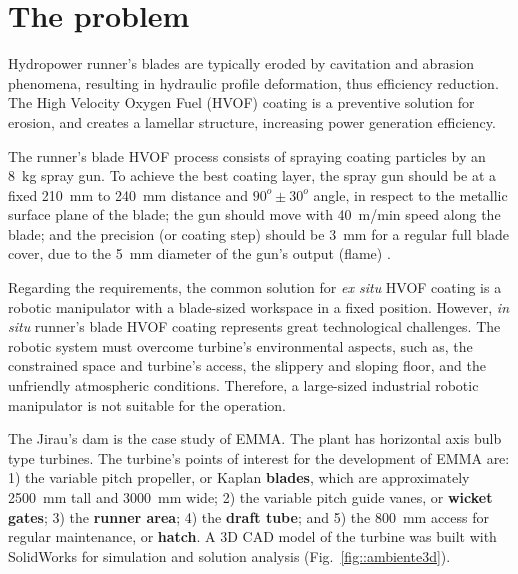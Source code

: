 \section{The problem}\label{problem}

Hydropower runner's blades are typically eroded by cavitation and abrasion
phenomena, resulting in hydraulic profile deformation, thus efficiency
reduction. The High Velocity Oxygen Fuel (HVOF) coating is a preventive
solution for erosion, and creates a lamellar structure, increasing
power generation efficiency. 

The runner's blade HVOF process consists of spraying coating particles
by an 8~kg spray gun. To achieve the best coating layer, the spray gun should be at a
fixed 210~mm to 240~mm distance and $90^o \pm 30^o$ angle, in respect
to the metallic surface plane of the blade; the gun should move with 40~m/min
speed along the blade; and the precision (or coating step) should be 3~mm for a
regular full blade cover, due to the 5~mm diameter of the gun's output (flame)
\cite{li2002effect}.

Regarding the requirements, the common solution for \textit{ex situ} HVOF
coating is a robotic manipulator with a blade-sized workspace in a fixed
position. However, \textit{in situ} runner's blade HVOF coating represents
great technological challenges. %
The robotic system must overcome
turbine's environmental aspects, such as, the constrained space and turbine's
access, the slippery and sloping floor, and the unfriendly atmospheric
conditions. Therefore, a large-sized industrial robotic manipulator is not
suitable for the operation.

The Jirau's dam is the case study of EMMA. The plant has horizontal
axis bulb type turbines. 
The turbine's points of interest for the
development of EMMA are: 1) the variable pitch propeller, or Kaplan
\textbf{blades}, which are approximately 2500~mm tall and 3000~mm wide; 2) the
variable pitch guide vanes, or \textbf{wicket gates}; 3) the \textbf{runner
area}; 4) the \textbf{draft tube}; and 5) the 800~mm access for regular
maintenance, or \textbf{hatch}. A 3D CAD model of the turbine was built with
SolidWorks\raisebox{1ex}{\textregistered} for simulation and solution analysis
(Fig.~\ref{fig::ambiente3d}). 
 
